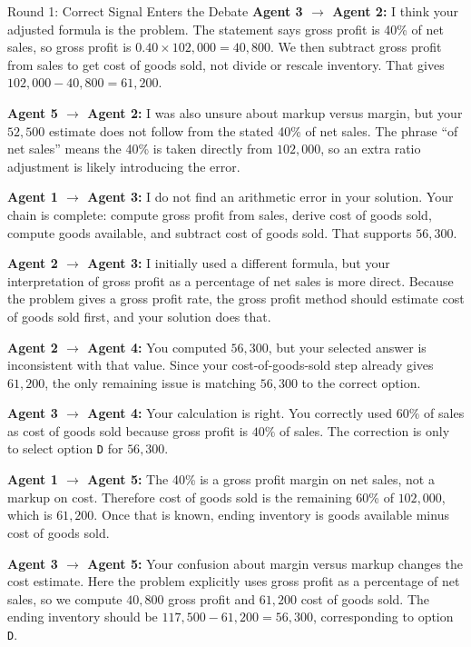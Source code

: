 \begin{roundbox}{Round 1: Correct Signal Enters the Debate}
\textbf{Agent 3 $\rightarrow$ Agent 2:} I think your adjusted formula is the problem. The statement says gross profit is 40\% of net sales, so gross profit is $0.40\times 102{,}000=40{,}800$. We then subtract gross profit from sales to get cost of goods sold, not divide or rescale inventory. That gives $102{,}000-40{,}800=61{,}200$.

\textbf{Agent 5 $\rightarrow$ Agent 2:} I was also unsure about markup versus margin, but your $52{,}500$ estimate does not follow from the stated 40\% of net sales. The phrase ``of net sales'' means the 40\% is taken directly from $102{,}000$, so an extra ratio adjustment is likely introducing the error.

\textbf{Agent 1 $\rightarrow$ Agent 3:} I do not find an arithmetic error in your solution. Your chain is complete: compute gross profit from sales, derive cost of goods sold, compute goods available, and subtract cost of goods sold. That supports $56{,}300$.

\textbf{Agent 2 $\rightarrow$ Agent 3:} I initially used a different formula, but your interpretation of gross profit as a percentage of net sales is more direct. Because the problem gives a gross profit rate, the gross profit method should estimate cost of goods sold first, and your solution does that.

\textbf{Agent 2 $\rightarrow$ Agent 4:} You computed $56{,}300$, but your selected answer is inconsistent with that value. Since your cost-of-goods-sold step already gives $61{,}200$, the only remaining issue is matching $56{,}300$ to the correct option.

\textbf{Agent 3 $\rightarrow$ Agent 4:} Your calculation is right. You correctly used $60\%$ of sales as cost of goods sold because gross profit is $40\%$ of sales. The correction is only to select option \texttt{D} for $56{,}300$.

\textbf{Agent 1 $\rightarrow$ Agent 5:} The 40\% is a gross profit margin on net sales, not a markup on cost. Therefore cost of goods sold is the remaining 60\% of $102{,}000$, which is $61{,}200$. Once that is known, ending inventory is goods available minus cost of goods sold.

\textbf{Agent 3 $\rightarrow$ Agent 5:} Your confusion about margin versus markup changes the cost estimate. Here the problem explicitly uses gross profit as a percentage of net sales, so we compute $40{,}800$ gross profit and $61{,}200$ cost of goods sold. The ending inventory should be $117{,}500-61{,}200=56{,}300$, corresponding to option \texttt{D}.


\end{roundbox}
